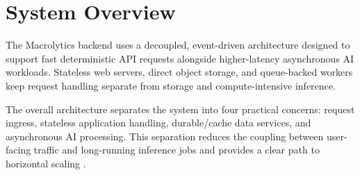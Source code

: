 \documentclass[11pt,a4paper,twoside]{article}
\begin{document}
\section{System Overview}

\begin{introbox}
The Macrolytics backend uses a decoupled, event-driven architecture designed to support
fast deterministic API requests alongside higher-latency asynchronous AI workloads.
Stateless web servers, direct object storage, and queue-backed workers keep request handling
separate from storage and compute-intensive inference.
\end{introbox}

The overall architecture separates the system into four practical concerns: request ingress,
stateless application handling, durable/cache data services, and asynchronous AI processing.
This separation reduces the coupling between user-facing traffic and long-running inference jobs
and provides a clear path to horizontal scaling \cite{xu2020system}.
\end{document}
